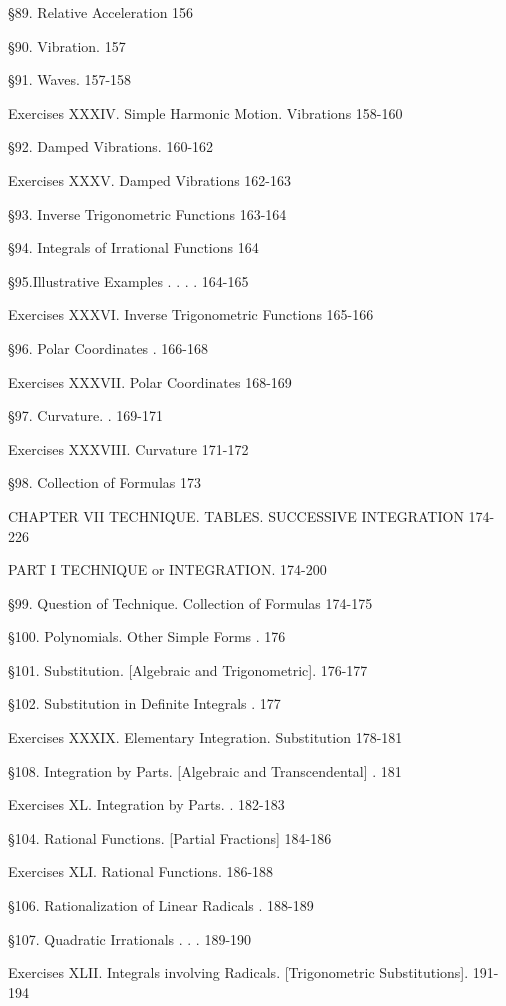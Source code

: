 \documentclass[12pt]{article}
\begin{document}
\S 89. Relative Acceleration 156

\S 90. Vibration. 157

\S 91. Waves. 157-158

Exercises XXXIV. Simple Harmonic Motion. Vibrations 158-160

\S 92. Damped Vibrations. 160-162

Exercises XXXV. Damped Vibrations 162-163

\S 93. Inverse Trigonometric Functions 163-164

\S 94. Integrals of Irrational Functions 164

\S 95.Illustrative Examples . . . . 164-165

Exercises XXXVI. Inverse Trigonometric Functions 165-166

\S 96. Polar Coordinates . 166-168

Exercises XXXVII. Polar Coordinates 168-169

\S 97. Curvature. . 169-171

Exercises XXXVIII. Curvature 171-172

\S 98. Collection of Formulas 173

CHAPTER VII TECHNIQUE. TABLES. SUCCESSIVE INTEGRATION 174-226

\begin{center}
PART I TECHNIQUE or INTEGRATION. 174-200
\end{center}

\S 99. Question of Technique. Collection of Formulas 174-175

\S 100. Polynomials. Other Simple Forms . 176

\S 101. Substitution. [Algebraic and Trigonometric]. 176-177

\S 102. Substitution in Definite Integrals . 177

Exercises XXXIX. Elementary Integration. Substitution 178-181

\S 108. Integration by Parts. [Algebraic and Transcendental] .  181

Exercises XL. Integration by Parts. .  182-183

\S 104. Rational Functions. [Partial Fractions] 184-186

Exercises XLI. Rational Functions. 186-188

\S 106. Rationalization of Linear Radicals . 188-189

\S 107. Quadratic Irrationals . . . 189-190

Exercises XLII. Integrals involving Radicals. [Trigonometric Substitutions]. 191-194
\end{document}
